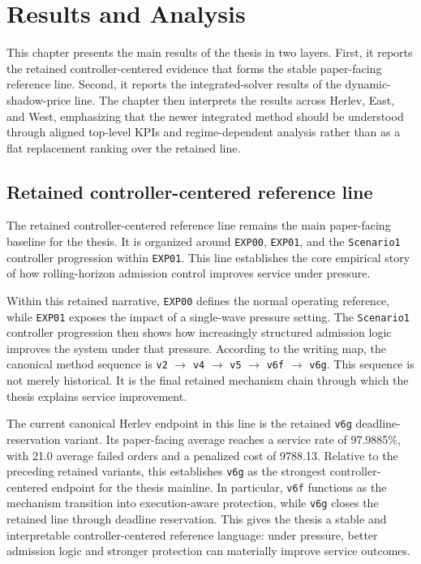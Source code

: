 \chapter{Results and Analysis}
\label{chap:results}

This chapter presents the main results of the thesis in two layers. First, it reports the retained controller-centered evidence that forms the stable paper-facing reference line. Second, it reports the integrated-solver results of the dynamic-shadow-price line. The chapter then interprets the results across Herlev, East, and West, emphasizing that the newer integrated method should be understood through aligned top-level KPIs and regime-dependent analysis rather than as a flat replacement ranking over the retained line.

\section{Retained controller-centered reference line}

The retained controller-centered reference line remains the main paper-facing baseline for the thesis. It is organized around \texttt{EXP00}, \texttt{EXP01}, and the \texttt{Scenario1} controller progression within \texttt{EXP01}. This line establishes the core empirical story of how rolling-horizon admission control improves service under pressure.

Within this retained narrative, \texttt{EXP00} defines the normal operating reference, while \texttt{EXP01} exposes the impact of a single-wave pressure setting. The \texttt{Scenario1} controller progression then shows how increasingly structured admission logic improves the system under that pressure. According to the writing map, the canonical method sequence is \texttt{v2} $\rightarrow$ \texttt{v4} $\rightarrow$ \texttt{v5} $\rightarrow$ \texttt{v6f} $\rightarrow$ \texttt{v6g}. This sequence is not merely historical. It is the final retained mechanism chain through which the thesis explains service improvement.

The current canonical Herlev endpoint in this line is the retained \texttt{v6g} deadline-reservation variant. Its paper-facing average reaches a service rate of 97.9885\%, with 21.0 average failed orders and a penalized cost of 9788.13. Relative to the preceding retained variants, this establishes \texttt{v6g} as the strongest controller-centered endpoint for the thesis mainline. In particular, \texttt{v6f} functions as the mechanism transition into execution-aware protection, while \texttt{v6g} closes the retained line through deadline reservation. This gives the thesis a stable and interpretable controller-centered reference language: under pressure, better admission logic and stronger protection can materially improve service outcomes.

